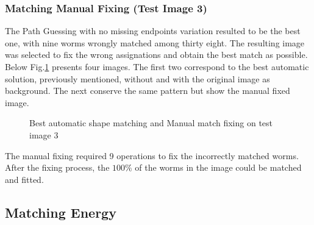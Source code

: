 \subsubsection*{Matching Manual Fixing (Test Image 3)}

The Path Guessing with no missing endpoints variation resulted to be the 
best one, with nine worms wrongly matched among thirty eight. The 
resulting image was selected to fix the wrong assignations and obtain
the best match as possible.
Below Fig.\ref{fig:best3} presents four images. The first two correspond to the
best automatic solution, previously mentioned, without and with the original
image as background. The next conserve the same pattern but show the manual
fixed image.

\begin{figure}[h!]
  \centering
\qquad
\qquad
\qquad
  \caption{Best automatic shape matching and Manual match fixing on test image 3}
  \label{fig:best3}
\end{figure}


The manual fixing required 9 operations to fix the incorrectly matched worms.
After the fixing process, the $100\%$ of the worms in the image could be
matched and fitted.
\subsection{Matching Energy}

